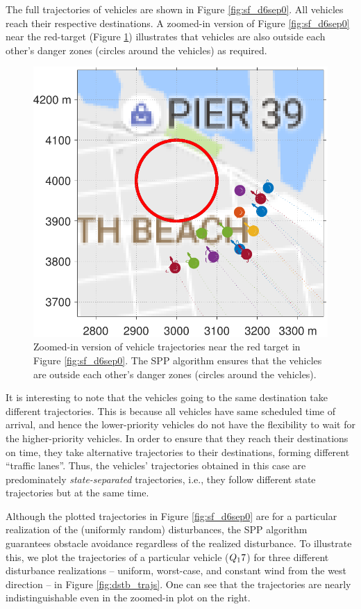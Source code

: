 The full trajectories of vehicles are shown in Figure \ref{fig:sf_d6sep0}. All vehicles reach their respective destinations. A zoomed-in version of Figure \ref{fig:sf_d6sep0} near the red-target (Figure \ref{fig:sf_d6sep0_zoomed}) illustrates that vehicles are also outside each other's danger zones (circles around the vehicles) as required. 
%
\begin{figure}[h]
  \centering
  \includegraphics[width=\columnwidth]{figs/sf_d6sep0_zoomed}
  \caption{Zoomed-in version of vehicle trajectories near the red target in Figure \ref{fig:sf_d6sep0}. The SPP algorithm ensures that the vehicles are outside each other's danger zones (circles around the vehicles).} 
  \label{fig:sf_d6sep0_zoomed}
\end{figure}
It is interesting to note that the vehicles going to the same destination take different trajectories. This is because all vehicles have same scheduled time of arrival, and hence the lower-priority vehicles do not have the flexibility to wait for the higher-priority vehicles. In order to ensure that they reach their destinations on time, they take alternative trajectories to their destinations, forming different ``traffic lanes''. Thus, the vehicles' trajectories obtained in this case are predominately \textit{state-separated} trajectories, i.e., they follow different state trajectories but at the same time. 

Although the plotted trajectories in Figure \ref{fig:sf_d6sep0} are for a particular realization of the (uniformly random) disturbances, the SPP algorithm guarantees obstacle avoidance regardless of the realized disturbance. To illustrate this, we plot the trajectories of a particular vehicle ($Q_17$) for three different disturbance realizations -- uniform, worst-case, and constant wind from the west direction -- in Figure \ref{fig:dstb_trajs}. One can see that the trajectories are nearly indistinguishable even in the zoomed-in plot on the right. 

